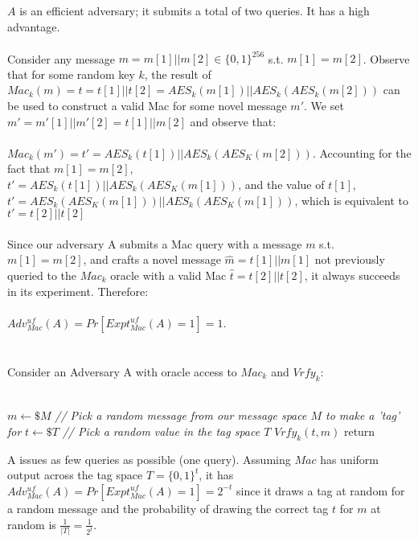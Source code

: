 \documentclass[]{article}
\begin{document}
\begin{enumerate}[label=(\alph*)]
	$A$ is an efficient adversary; it submits a total of two queries. It has a high advantage.
	\\\\
	Consider any message $m = m[1] || m[2] \in \{0,1\}^{256}$ s.t. $m[1] = m[2]$. Observe that for some random key $k$, the result of $Mac_k(m) = t = t[1] || t[2] = AES_k(m[1]) || AES_k(AES_k(m[2]))$ can be used to construct a valid Mac for some novel message $m'$. We set $m' = m'[1] || m'[2] = t[1] || m[2]$ and observe that:
	\\\\
 	$Mac_k(m') = t' = AES_k(t[1]) || AES_k(AES_K(m[2]))$. Accounting for the fact that $m[1] = m[2]$,\\
 	$t' = AES_k(t[1]) || AES_k(AES_K(m[1]))$, and the value of $t[1]$,\\
 	$t' = AES_k(AES_K(m[1])) || AES_k(AES_K(m[1]))$, which is equivalent to\\
 	$t' = t[2] || t[2]$
	\\\\
	Since our adversary A submits a Mac query with a message $m$ s.t. $m[1] = m[2]$, and crafts a novel message $\hat{m} = t[1] || m[1]$ not previously queried to the $Mac_k$ oracle with a valid Mac $\hat{t} = t[2] || t[2]$, it always succeeds in its experiment. Therefore:
	\\\\
	$Adv_{Mac}^{uf}(A) = Pr[Expt^{uf}_{Mac}(A) = 1] = 1$.
	
\end{enumerate}

\section{}
Consider an Adversary A with oracle access to $Mac_k$ and $Vrfy_k$:
\\\\
\begin{algorithm}[H]
	\SetAlgoLined
	$m \leftarrow\$ M $ \emph{// Pick a random message from our message space $M$ to make a 'tag' for}\;
	$t \leftarrow\$ T$ \emph{// Pick a random value in the tag space $T$}\;
	$Vrfy_k(t, m)$\;
	return \;
	\caption{$A(Mac)$}
\end{algorithm}

A issues as few queries as possible (one query). Assuming $Mac$ has uniform output across the tag space $T = \{0,1\}^t$, it has $Adv_{Mac}^{uf}(A) = Pr[Expt^{uf}_{Mac}(A) = 1] = 2^{-t}$ since it draws a tag at random for a random message and the probability of drawing the correct tag $t$ for $m$ at random is $\frac{1}{|T|} = \frac{1}{2^t}$.
\end{document}
